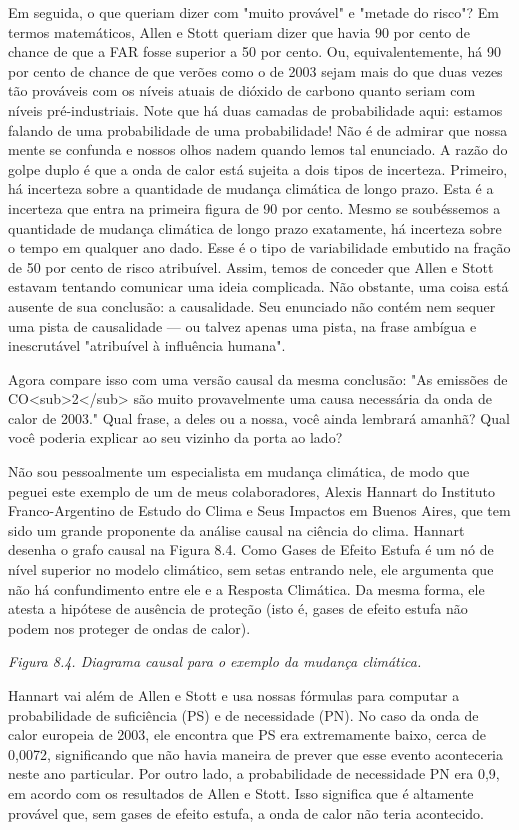 \documentclass[11pt,a5paper,twoside]{book}
\begin{document}
Em seguida, o que queriam dizer com "muito provável" e "metade do risco"? Em termos matemáticos, Allen e Stott queriam dizer que havia 90 por cento de chance de que a FAR fosse superior a 50 por cento. Ou, equivalentemente, há 90 por cento de chance de que verões como o de 2003 sejam mais do que duas vezes tão prováveis com os níveis atuais de dióxido de carbono quanto seriam com níveis pré-industriais. Note que há duas camadas de probabilidade aqui: estamos falando de uma probabilidade de uma probabilidade! Não é de admirar que nossa mente se confunda e nossos olhos nadem quando lemos tal enunciado. A razão do golpe duplo é que a onda de calor está sujeita a dois tipos de incerteza. Primeiro, há incerteza sobre a quantidade de mudança climática de longo prazo. Esta é a incerteza que entra na primeira figura de 90 por cento. Mesmo se soubéssemos a quantidade de mudança climática de longo prazo exatamente, há incerteza sobre o tempo em qualquer ano dado. Esse é o tipo de variabilidade embutido na fração de 50 por cento de risco atribuível. Assim, temos de conceder que Allen e Stott estavam tentando comunicar uma ideia complicada. Não obstante, uma coisa está ausente de sua conclusão: a causalidade. Seu enunciado não contém nem sequer uma pista de causalidade — ou talvez apenas uma pista, na frase ambígua e inescrutável "atribuível à influência humana".

Agora compare isso com uma versão causal da mesma conclusão: "As emissões de CO<sub>2</sub> são muito provavelmente uma causa necessária da onda de calor de 2003." Qual frase, a deles ou a nossa, você ainda lembrará amanhã? Qual você poderia explicar ao seu vizinho da porta ao lado?

Não sou pessoalmente um especialista em mudança climática, de modo que peguei este exemplo de um de meus colaboradores, Alexis Hannart do Instituto Franco-Argentino de Estudo do Clima e Seus Impactos em Buenos Aires, que tem sido um grande proponente da análise causal na ciência do clima. Hannart desenha o grafo causal na Figura 8.4. Como Gases de Efeito Estufa é um nó de nível superior no modelo climático, sem setas entrando nele, ele argumenta que não há confundimento entre ele e a Resposta Climática. Da mesma forma, ele atesta a hipótese de ausência de proteção (isto é, gases de efeito estufa não podem nos proteger de ondas de calor).

\textit{Figura 8.4. Diagrama causal para o exemplo da mudança climática.}

Hannart vai além de Allen e Stott e usa nossas fórmulas para computar a probabilidade de suficiência (PS) e de necessidade (PN). No caso da onda de calor europeia de 2003, ele encontra que PS era extremamente baixo, cerca de 0,0072, significando que não havia maneira de prever que esse evento aconteceria neste ano particular. Por outro lado, a probabilidade de necessidade PN era 0,9, em acordo com os resultados de Allen e Stott. Isso significa que é altamente provável que, sem gases de efeito estufa, a onda de calor não teria acontecido.
\end{document}
